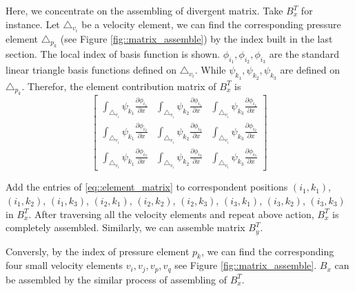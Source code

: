 \documentclass[mathpazo]{aamm}
\begin{document}
   Here, we concentrate on the assembling of divergent matrix. Take 
   $B_x^T$ for instance. Let $\triangle_{v_i}$ be a velocity element,
   we can find the corresponding pressure element $\triangle_{p_k}$ 
   (see Figure \ref{fig::matrix_assemble}) by the index built in the last
   section. The local index of basis function is shown. $\phi_{i_1},
   \phi_{i_2}, \phi_{i_3}$ are the standard linear triangle basis
   functions defined on $\triangle_{v_i}$. While
   $\psi_{k_1}, \psi_{k_2}, \psi_{k_3}$ are defined on
   $\triangle_{p_k}$. Therefor, the element contribution matrix of $B_x^T$ is 
   \begin{equation}
     \left[
     \begin{array}{lll}
       \int_{\triangle_{v_i}}\psi_{k_1} \frac{\partial
         \phi_{i_1}}{\partial x} & \int_{\triangle_{v_i}} \psi_{k_2}
       \frac{\partial \phi_{i_1}}{\partial x} & \int_{\triangle_{v_i}}
       \psi_{k_3} \frac{\partial \phi_{i_1}}{\partial x} \\
       \int_{\triangle_{v_i}} \psi_{k_1} \frac{\partial
         \phi_{i_2}}{\partial x} & \int_{\triangle_{v_i}} \psi_{k_2}
       \frac{\partial \phi_{i_2}}{\partial x} & \int_{\triangle_{v_i}}
       \psi_{k_3} \frac{\partial \phi_{i_2}}{\partial x} \\
       \int_{\triangle_{v_i}} \psi_{k_1} \frac{\partial
         \phi_{i_3}}{\partial x} & \int_{\triangle_{v_i}} \psi_{k_2}
       \frac{\partial \phi_{i_3}}{\partial x} & \int_{\triangle_{v_i}}
       \psi_{k_3} \frac{\partial \phi_{i_3}}{\partial x}
     \end{array}
   \right]
   \label{eq::element_matrix}
   \end{equation}
   
   Add the entries of \eqref{eq::element_matrix} to correspondent positions
   $(i_1,k_1)$, $(i_1, k_2)$, $(i_1, k_3)$, $(i_2, k_1)$, $(i_2, k_2)$,
   $(i_2,k_3)$, $(i_3, k_1)$, $(i_3, k_2)$, $(i_3, k_3)$ in $B_x^T$. 
   After traversing all the velocity elements and repeat above action,
   $B_x^T$ is completely assembled. Similarly, we can assemble matrix
   $B_y^T$.

   Conversly, by the index of pressure element $p_k$, we can find the 
   corresponding four small velocity elements $v_i, v_j, v_p, v_q$ see
   Figure \ref{fig::matrix_assemble}. $B_x$ can be assembled by the
   similar process of assembling of $B_x^T$.
   
\end{document}
